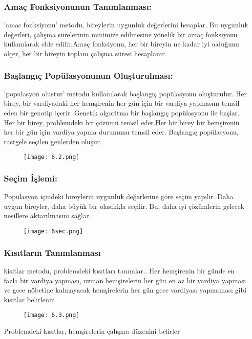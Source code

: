 \documentclass[12pt, a4paper]{article}
\begin{document}
\begin{flushleft}
\subsubsection{Amaç Fonksiyonunun Tanımlanması: }'amac fonksiyonu' metodu, bireylerin uygunluk değerlerini hesaplar. Bu uygunluk değerleri, çalışma sürelerinin minimize edilmesine yönelik bir amaç fonksiyonu kullanılarak elde edilir.Amaç fonksiyonu, her bir bireyin ne kadar iyi olduğunu ölçer, her bir bireyin toplam çalışma süresi hesaplanır.


\subsubsection{Başlangıç Popülasyonunun Oluşturulması:}'populasyon olustur' metodu kullanılarak başlangıç popülasyonu oluşturulur. Her birey, bir vardiyadaki her hemşirenin her gün için bir vardiya yapmasını temsil eden bir genotip içerir. Genetik algoritma bir başlangıç popülasyonu ile başlar. Her bir birey, problemdeki bir çözümü temsil eder.Her bir birey bir hemşirenin her bir gün için vardiya yapma durumunu temsil eder. Başlangıç popülasyonu, rastgele seçilen genlerden oluşur.

\begin{figure}[!h]
	\centering
	\texttt{[image: 6.2.png]}
	\\[20pt]
\end{figure}


\subsubsection{Seçim İşlemi: }Popülasyon içindeki bireylerin uygunluk değerlerine göre seçim yapılır. Daha uygun bireyler, daha büyük bir olasılıkla seçilir. Bu, daha iyi çözümlerin gelecek nesillere aktarılmasını sağlar.
\begin{figure}[!h]
	\centering
	\texttt{[image: 6sec.png]}
	\\[20pt]
\end{figure}
\newpage
\subsubsection{Kısıtların Tanımlanması}kisitlar metodu, problemdeki kısıtları tanımlar..  Her hemşirenin bir günde en fazla bir vardiya yapması, uzman hemşirelerin her gün en az bir vardiya yapması ve gece nöbetine kalmayacak hemşirelerin her gün gece vardiyası yapmaması gibi kısıtlar belirlenir.\\
\begin{figure}[!h]
	\centering
	\texttt{[image: 6.3.png]}
	\\[20pt]
\end{figure}
Problemdeki kısıtlar, hemşirelerin çalışma düzenini belirler
\clearpage

\end{flushleft}
\end{document}
